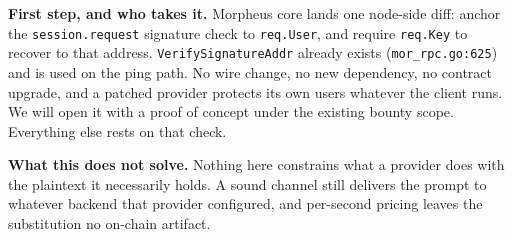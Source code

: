 \documentclass[10pt,a4paper]{article}
\newcommand{\code}[1]{\texttt{\small #1}}
\begin{document}
\noindent\textbf{First step, and who takes it.}
Morpheus core lands one node-side diff: anchor the \code{session.request}
signature check to \code{req.User}, and require \code{req.Key} to recover to
that address. \code{VerifySignatureAddr} already
exists (\code{mor\_rpc.go:625}) and is used on the ping path. No wire change, no
new dependency, no contract upgrade, and a patched provider protects its own
users whatever the client runs. We will open it with a proof of concept under
the existing bounty scope. Everything else rests on that check.

\vspace{0.35ex}
\noindent\textbf{What this does not solve.}
Nothing here constrains what a provider does with the plaintext it necessarily
holds. A sound channel still delivers the prompt to whatever backend that
provider configured, and per-second pricing leaves the substitution no on-chain
artifact.

\vspace{0.5ex}
\end{document}

